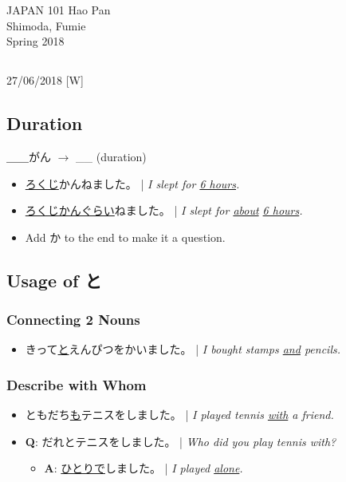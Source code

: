 \documentclass{article}
\begin{document}
 \begin{CJK}{UTF8}{min}

\noindent
{JAPAN 101 \hfill Hao Pan}\\
{Shimoda, Fumie}\\
{Spring 2018}


\begin{center}
\section{}
\noindent
{\hfill 27/06/2018 [W]}
\end{center}

\subsection{Duration}

＿＿がん $\rightarrow$ \_\_ (duration)

\begin{itemize}
\item \uline{ろくじ}かんねました。 | \emph{I slept for \uline{6 hours}.}
\item \uline{ろくじかん}\uline{ぐらい}ねました。 | \emph{I slept for \uline{about} \uline{6 hours}.}
\item Add か to the end to make it a question.
\end{itemize}

\subsection{Usage of と}

\subsubsection{Connecting 2 Nouns}
\begin{itemize}
\item きって\uline{と}えんぴつをかいました。 | \emph{I bought stamps \uline{and} pencils.}
\end{itemize}

\subsubsection{Describe with Whom}
\begin{itemize}
\item ともだち\uline{も}テニスをしました。 | \emph{I played tennis \uline{with} a friend.}
\item {\bf Q}: だれとテニスをしました。 | \emph{Who did you play tennis with?}
\begin{itemize}
\item {\bf A}: \uline{ひとりで}しました。 | \emph{I played \uline{alone}.}
\end{itemize}
\end{itemize}


\end{CJK}
\end{document}
